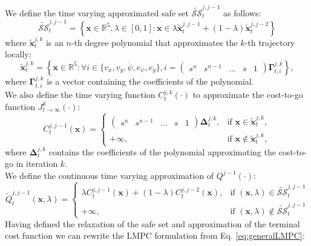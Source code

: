 We define the time varying approximated safe set $\tilde{\mathcal{SS}}_t^{j,j-1}$ as follows:
\begin{equation}
\tilde{\mathcal{SS}}_t^{j,j-1} = \left\{\bm{x}\in\mathbb{R}^5,\lambda\in[0,1]: \bm{x}\in\lambda \tilde{\bm{x}}_t^{j,j-1}+(1-\lambda)\tilde{\bm{x}}_t^{j,j-2}\right\}
\end{equation}
where $\tilde{\bm{x}}_t^{j,k}$ is an $n$-th degree polynomial that approximates the $k$-th trajectory locally:
\begin{equation}
\tilde{\bm{x}}_t^{j,k}=\left\{\bm{x}\in\mathbb{R}^5:\forall i\in\{v_x,v_y,\dot\psi,e_\psi,e_y\},i=\begin{pmatrix}s^n &s^{n-1}&...&s& 1\end{pmatrix}\bm{\Gamma}_{t,i}^{j,k}\right\},
\end{equation}
where $\bm{\Gamma}_{t,i}^{j,k}$ is a vector containing the coefficients of the polynomial.\\
We also define the time varying function $C_t^{j,k}(\cdot)$ to approximate the cost-to-go function $J_{t\rightarrow\infty}^k(\cdot)$:
\begin{equation}
C_t^{j,j-1}(\bm{x})=\begin{cases}
\begin{pmatrix}
s^n & s^{n-1} &...&s&1
\end{pmatrix}
\bm{\Delta}_t^{j,k},&\text{if } \bm{x}\in\tilde{\bm{x}}_t^{j,k},\\
+\infty,&\text{if } \bm{x}\not\in\tilde{\bm{x}}_t^{j,k},
\end{cases}
\end{equation}
where $\bm{\Delta}_t^{j,k}$ contains the coefficients of the polynomial approximating the cost-to-go in iteration $k$.\\
We define the continuous time varying approximation of $Q^{j-1}(\cdot)$:
\begin{equation}
\tilde Q_t^{j,j-1}(\bm{x},\lambda)=\begin{cases}
\lambda C_t^{j,j-1}(\bm{x})+(1-\lambda)C_t^{j,j-2}(\bm{x}),&\text{if }(\bm{x},\lambda)\in\tilde{\mathcal{SS}}_t^{j,j-1}\\
+\infty,&\text{if }(\bm{x},\lambda)\not\in\tilde{\mathcal{SS}}_t^{j,j-1}
\end{cases}
\end{equation}
Having defined the relaxation of the safe set and approximation of the terminal cost function we can rewrite the LMPC formulation from Eq. \eqref{eq:generalLMPC}:

